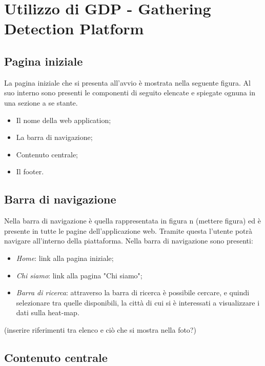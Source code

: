 \chapter{Utilizzo di GDP - Gathering Detection Platform}\label{UtilizzoDiGDPGatheringDetecionPlatform}

\section{Pagina iniziale}\label{UtilizzoDiGDPGatheringDetecionPlatformPaginaIniziale}
La pagina iniziale che si presenta all'avvio è mostrata nella seguente figura.
Al suo interno sono presenti le componenti di seguito elencate e spiegate ognuna in una sezione a se stante.
\begin{itemize}
	\item Il nome della web application;
	\item La barra di navigazione;
	\item Contenuto centrale;
	\item Il footer.
\end{itemize}

\section{Barra di navigazione}\label{UtilizzoDiGDPGatheringDetecionPlatformBarraDiNavigazione}

Nella barra di navigazione è quella rappresentata in figura n (mettere figura) ed è presente in tutte le pagine dell'applicazione web. Tramite questa l'utente potrà navigare all'interno della piattaforma. Nella barra di navigazione sono presenti:
\begin{itemize}
	\item \textit{Home}: link alla pagina iniziale;
	\item \textit{Chi siamo}: link alla pagina "Chi siamo";
	\item \textit{Barra di ricerca}: attraverso la barra di ricerca è possibile cercare, e quindi selezionare tra quelle disponibili, la città di cui si è interessati a visualizzare i dati sulla heat-map. 
\end{itemize}
(inserire riferimenti tra elenco e ciò che si mostra nella foto?)

\section{Contenuto centrale}\label{UtilizzoDiGDPGatheringDetecionPlatformContenutoCentrale}
